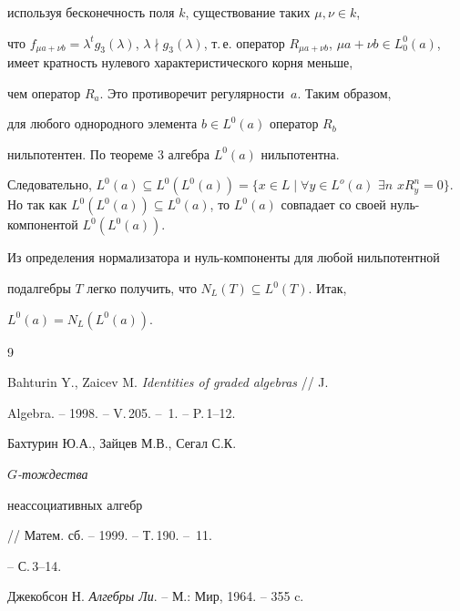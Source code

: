 \begin{pf}
используя бесконечность поля $k$, существование таких $\mu,\nu\in k$, 


что $f_{\mu a+\nu b}=\lambda^t g_3(\lambda)$, $\lambda\nmid 


g_3(\lambda)$, т.\,е. оператор $R_{\mu a+\nu b}$, $\mu a+\nu b\in 


L^0_0(a)$, имеет кратность нулевого характеристического корня меньше, 


чем оператор $R_a$. Это противоречит регулярности~$a$. Таким образом, 


для любого однородного элемента $b\in L^0(a)$ оператор $R_b$ 


нильпотентен. По теореме 3 алгебра $L^0(a)$ нильпотентна. 


Следовательно, $L^0(a)\subseteq L^0(L^0(a))=\{x\in L\mid\forall y\in 


L^o(a)$ $\exists n$ $x R^n_y=0\}$. Но так как $L^0(L^0(a))\subseteq 


L^0(a)$, то $L^0(a)$ совпадает со своей нуль-компонентой $L^0(L^0(a))$. 


Из определения нормализатора и нуль-компоненты для любой нильпотентной 


подалгебры $T$ легко получить, что $N_L(T)\subseteq L^0(T)$. Итак, 


$L^0(a)=N_L(L^0(a))$. 


\end{pf} 


 


\begin{thebibliography}{9} 


 




Bahturin Y., Zaicev M. {\em Identities of graded algebras} // J. 


Algebra. -- 1998. -- V.\,205. -- \No\,1. -- P.\,1--12. 




Бахтурин Ю.А., Зайцев М.В., Сегал С.К. {\em $G$-тождества 


неассоциативных алгебр} // Матем. сб. -- 1999. -- Т.\,190. -- \No\,11. 


-- С.\,3--14. 




Джекобсон Н. {\em Алгебры Ли}. -- М.: Мир, 1964. -- 355 c. 


 


\end{thebibliography}





\vskip 2cm












\label{end}





